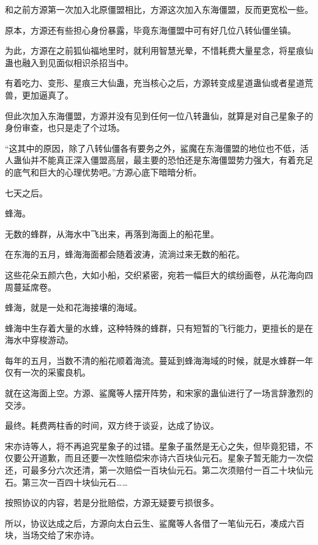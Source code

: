 
\begin{this_body}



和之前方源第一次加入北原僵盟相比，方源这次加入东海僵盟，反而更宽松一些。

原本，方源还有些担心身份暴露，毕竟东海僵盟中可有好几位八转仙僵坐镇。

为此，方源在之前狐仙福地里时，就利用智慧光晕，不惜耗费大量星念，将星痕仙蛊也融入到见面似相识杀招当中。

有着吃力、变形、星痕三大仙蛊，充当核心之后，方源转变成星道蛊仙或者星道荒兽，更加逼真了。

但此次加入东海僵盟，方源并没有见到任何一位八转蛊仙，就算是对自己星象子的身份审查，也只是走了个过场。

“这其中的原因，除了八转仙僵各有要务之外，鲨魔在东海僵盟的地位也不低，活人蛊仙并不能真正深入僵盟高层，最主要的恐怕还是东海僵盟势力强大，有着充足的底气和巨大的心理优势吧。”方源心底下暗暗分析。

七天之后。

蜂海。

无数的蜂群，从海水中飞出来，再落到海面上的船花里。

在东海的五月，蜂海海面都会随着波涛，流淌过来无数的船花。

这些花朵五颜六色，大如小船，交织紧密，宛若一幅巨大的缤纷画卷，从花海向四周蔓延席卷。

蜂海，就是一处和花海接壤的海域。

蜂海中生存着大量的水蜂，这种特殊的蜂群，只有短暂的飞行能力，更擅长的是在海水中穿梭游动。

每年的五月，当数不清的船花顺着海流。蔓延到蜂海海域的时候，就是水蜂群一年仅有一次的采蜜良机。

就在这海面上空。方源、鲨魔等人摆开阵势，和宋家的蛊仙进行了一场言辞激烈的交涉。

最终。耗费两柱香的时间，双方终于谈妥，达成了协议。

宋亦诗等人，将不再追究星象子的过错。星象子虽然是无心之失，但毕竟犯错，不仅要公开道歉，而且还要一次性赔偿宋亦诗六百块仙元石。星象子暂无能力一次偿还，可最多分六次还清，第一次赔偿一百块仙元石。第二次须赔付一百二十块仙元石。第三次一百四十块仙元石……

按照协议的内容，若是分批赔偿，方源无疑要亏损很多。

所以，协议达成之后，方源向太白云生、鲨魔等人各借了一笔仙元石，凑成六百块，当场交给了宋亦诗。


\end{this_body}
